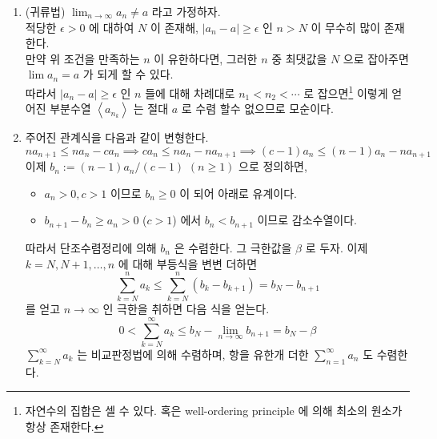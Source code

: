 \documentclass[12pt]{report}
\newcommand{\numl}[1]{\item[\large\textbf{\sffamily #1.}]}
\renewcommand{\span}[1]{\left\langle #1 \right\rangle}
\newcommand{\ra}{\rightarrow}
\newcommand{\abs}[1]{\left|#1\right|}
\newcommand{\ds}{\displaystyle}
\newcommand{\imp}{\implies}
\begin{document}
\begin{enumerate}
\numl{6} (귀류법) $\ds \lim_{n\ra\infty} a_n \neq a$ 라고 가정하자.\\
적당한 $\epsilon > 0$ 에 대하여 $N$ 이 존재해, $\abs{a_n - a} \geq \epsilon$ 인 $n>N$ 이 무수히 많이 존재한다.\\
만약 위 조건을 만족하는 $n$ 이 유한하다면, 그러한 $n$ 중 최댓값을 $N$ 으로 잡아주면 $\lim a_n = a$ 가 되게 할 수 있다.\\
따라서 $\abs{a_n-a} \geq \epsilon$ 인 $n$ 들에 대해 차례대로 $n_1 < n_2 < \cdots$ 로 잡으면\footnote{자연수의 집합은 셀 수 있다. 혹은 well-ordering principle 에 의해 최소의 원소가 항상 존재한다.} 이렇게 얻어진 부분수열 $\span{a_{n_k}}$ 는 절대 $a$ 로 수렴 할수 없으므로 모순이다.

\numl{8} 주어진 관계식을 다음과 같이 변형한다. $$na_{n+1} \leq na_n-ca_n \imp ca_n \leq na_n - na_{n+1} \imp (c-1)a_n\leq (n-1)a_n-na_{n+1}$$
이제 $b_n := (n-1)a_n / (c - 1)$ $(n\geq 1)$ 으로 정의하면,
\begin{itemize}
	\item $a_n>0, c > 1$ 이므로 $b_n \geq0$ 이 되어 아래로 유계이다.
	\item $b_{n+1} - b_n \geq a_n > 0$ ($c>1$) 에서 $b_n < b_{n+1}$ 이므로 감소수열이다.
\end{itemize}
따라서 단조수렴정리에 의해 $b_n$ 은 수렴한다. 그 극한값을 $\beta$ 로 두자. 이제 $k = N, N+1, \dots, n$ 에 대해 부등식을 변변 더하면
$$\sum_{k=N}^n a_k \leq \sum_{k=N}^n(b_k - b_{k+1}) = b_N-b_{n+1}$$ 를 얻고 $n\ra \infty$ 인 극한을 취하면 다음 식을 얻는다.
$$0 < \sum_{k=N}^\infty a_k \leq b_N-\lim_{n\ra \infty} b_{n+1} = b_N-\beta $$
$\sum_{k=N}^\infty a_k$ 는 비교판정법에 의해 수렴하며, 항을 유한개 더한 $\sum_{n=1}^\infty a_n$ 도 수렴한다.

\end{enumerate}
\end{document}
